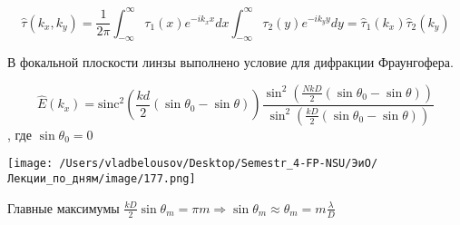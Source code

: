 \documentclass[12pt, a4paper]{report}
\begin{document}
\[ \hat{ \tau } (k_x , k_y ) = \frac{1}{2 \pi } \int_{-\infty}^{\infty}  \tau_1 (x ) e^{ - i k_x x } dx \int_{-\infty}^{\infty} \tau_2 (y ) e^{ - i k_y y } dy = \hat{ \tau } _1 (k_x ) \hat{ \tau }_2 (k_y)       \] 

В фокальной плоскости линзы выполнено условие для дифракции Фраунгофера. 


\[ \hat{ E }  (k_x ) = \mathrm{sinc }  ^2 \left(  \frac{kd}{2 }  \left(  \sin \theta_0 - \sin \theta  \right) \right)  \frac{\displaystyle  \sin  ^2 \left( \frac{NkD}{2 }  \left( \sin \theta_0 - \sin \theta \right) \right)}{\displaystyle \sin  ^2 \left( \frac{kD}{2 }  \left(  \sin \theta_0 - \sin \theta \right) \right)}  \] 
, где \( \sin \theta_0 = 0 \) 

\begin{center}
    \texttt{[image: /Users/vladbelousov/Desktop/Semestr\_4-FP-NSU/ЭиО/Лекции\_по\_дням/image/177.png]}
\end{center}

Главные максимумы \( \displaystyle  \frac{kD}{2 }  \sin \theta_m = \pi m \Rightarrow \sin \theta_m \approx \theta_m = m \frac{\lambda}{D }  \) 


\ifdefined\mainfile
\else
    
\end{document}
